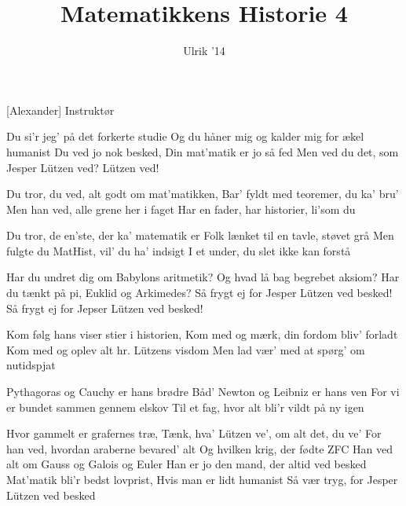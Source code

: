 \documentclass[a4paper,11pt]{article}
\title{Matematikkens Historie 4}
\author{Ulrik '14}
\begin{document}
\maketitle

\begin{roles}
[Alexander] Instruktør
\end{roles}

\begin{song}
 Du si’r jeg’ på det forkerte studie
Og du håner mig og kalder mig for ækel humanist
Du ved jo nok besked,
Din mat’matik er jo så fed
Men ved du det, som Jesper Lützen ved?
Lützen ved!

 Du tror, du ved, alt godt om mat’matikken,
Bar’ fyldt med teoremer, du ka’ bru’
Men han ved, alle grene her i faget
Har en fader, har historier, li’som du

 Du tror, de en’ste, der ka’ matematik er
Folk lænket til en tavle, støvet grå
Men fulgte du MatHist, vil’ du ha’ indsigt
I et under, du slet ikke kan forstå

 Har du undret dig om Babylons aritmetik?
Og hvad lå bag begrebet aksiom?
Har du tænkt på pi, Euklid og Arkimedes?
Så frygt ej for Jesper Lützen ved besked!
Så frygt ej for Jepser Lützen ved besked!

 Kom følg hans viser stier i historien,
Kom med og mærk, din fordom bliv’ forladt
Kom med og oplev alt hr. Lützens visdom
Men lad vær’ med at spørg’ om nutidspjat

 Pythagoras og Cauchy er hans brødre
Båd’ Newton og Leibniz er hans ven
For vi er bundet sammen gennem elskov
Til et fag, hvor alt bli’r vildt på ny igen

 Hvor gammelt er grafernes træ,
Tænk, hva’ Lützen ve’, om alt det, du ve’
For han ved, hvordan araberne bevared’ alt
Og hvilken krig, der fødte ZFC
Han ved alt om Gauss og Galois og Euler
Han er jo den mand, der altid ved besked
Mat’matik bli’r bedst lovprist,
Hvis man er lidt humanist
Så vær tryg, for Jesper Lützen ved besked




\end{song}
\end{document}

